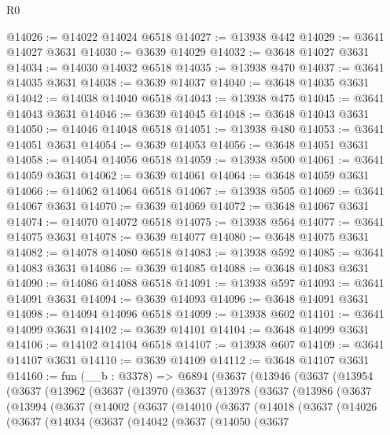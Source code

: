 \begin{lexlean}{R0}
\begin{coremodule}
@14026 := @14022 @14024 @6518
@14027 := @13938 @442
@14029 := @3641 @14027 @3631
@14030 := @3639 @14029
@14032 := @3648 @14027 @3631
@14034 := @14030 @14032 @6518
@14035 := @13938 @470
@14037 := @3641 @14035 @3631
@14038 := @3639 @14037
@14040 := @3648 @14035 @3631
@14042 := @14038 @14040 @6518
@14043 := @13938 @475
@14045 := @3641 @14043 @3631
@14046 := @3639 @14045
@14048 := @3648 @14043 @3631
@14050 := @14046 @14048 @6518
@14051 := @13938 @480
@14053 := @3641 @14051 @3631
@14054 := @3639 @14053
@14056 := @3648 @14051 @3631
@14058 := @14054 @14056 @6518
@14059 := @13938 @500
@14061 := @3641 @14059 @3631
@14062 := @3639 @14061
@14064 := @3648 @14059 @3631
@14066 := @14062 @14064 @6518
@14067 := @13938 @505
@14069 := @3641 @14067 @3631
@14070 := @3639 @14069
@14072 := @3648 @14067 @3631
@14074 := @14070 @14072 @6518
@14075 := @13938 @564
@14077 := @3641 @14075 @3631
@14078 := @3639 @14077
@14080 := @3648 @14075 @3631
@14082 := @14078 @14080 @6518
@14083 := @13938 @592
@14085 := @3641 @14083 @3631
@14086 := @3639 @14085
@14088 := @3648 @14083 @3631
@14090 := @14086 @14088 @6518
@14091 := @13938 @597
@14093 := @3641 @14091 @3631
@14094 := @3639 @14093
@14096 := @3648 @14091 @3631
@14098 := @14094 @14096 @6518
@14099 := @13938 @602
@14101 := @3641 @14099 @3631
@14102 := @3639 @14101
@14104 := @3648 @14099 @3631
@14106 := @14102 @14104 @6518
@14107 := @13938 @607
@14109 := @3641 @14107 @3631
@14110 := @3639 @14109
@14112 := @3648 @14107 @3631
@14160 := fun (__b : @3378) =>
  @6894
    (@3637
      (@13946
        (@3637
          (@13954
            (@3637
              (@13962
                (@3637
                  (@13970
                    (@3637
                      (@13978
                        (@3637
                          (@13986
                            (@3637
                              (@13994
                                (@3637
                                  (@14002
                                    (@3637
                                      (@14010
                                        (@3637
                                          (@14018
                                            (@3637
                                              (@14026
                                                (@3637
                                                  (@14034
                                                    (@3637
                                                      (@14042
                                                        (@3637
                                                          (@14050
                                                            (@3637

\end{coremodule}
\end{lexlean}

